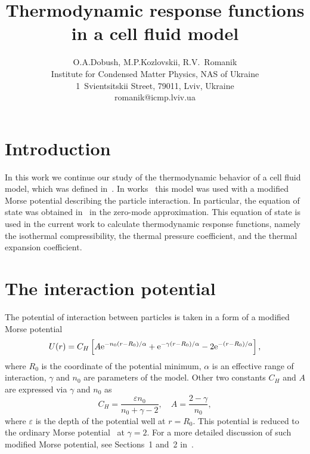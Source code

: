 \documentclass[12pt]{article}
\title{Thermodynamic response functions in a cell fluid model}
\author{O.A.Dobush, M.P.Kozlovskii, R.V.~Romanik
	\\ \small Institute for Condensed Matter Physics, NAS of Ukraine 
	\\ \small 1~Svientsitskii Street, 79011, Lviv, Ukraine 
	\\ \small romanik@icmp.lviv.ua}
\begin{document}
	
	\maketitle
	
	
	\section{Introduction}
	
	In this work we continue our study of the thermodynamic behavior of a cell fluid model, which was defined in~\cite{KozitskyKozlovskiiDobush2018book,KozitskyKozlovskiiDobush2020}. In works~\cite{KozlovskiiDobush2020,PylyukDobush2020,PylyukEtAlJML2023,PylyukKozlovskiiDobushUJP2023b} this model was used with a modified Morse potential describing the particle interaction. In particular, the equation of state was obtained in~\cite{KozlovskiiDobush2020} in the zero-mode approximation. This equation of state is used in the current work to calculate thermodynamic response functions, namely the isothermal compressibility, the thermal pressure coefficient, and the thermal expansion coefficient.
	
	\section{The interaction potential}
	The potential of interaction between particles is taken in a form of a modified Morse potential
	\begin{equation}
		\label{def:mod_morse}
		U(r) = C_{H} \left[A {\rm e}^{-n_0(r-R_0)/\alpha} + {\rm e}^{-\gamma(r - R_0)/\alpha} -2{\rm e}^{-(r-R_0)/\alpha}\right],
	\end{equation}
	where $R_0$ is the coordinate of the potential minimum, $\alpha$ is an effective range of interaction, $\gamma$ and $n_0$ are parameters of the model. Other two constants $C_{H}$ and $A$ are expressed via $\gamma$ and $n_0$ as
	\begin{equation}
		C_{H} = \frac{\varepsilon n_0}{n_0 + \gamma - 2}, \quad A = \frac{2 - \gamma}{n_0},
	\end{equation}
	where $\varepsilon$ is the depth of the potential well at $r=R_0$. This potential is reduced to the ordinary Morse potential~\cite{Morse1929} at $\gamma=2$. For a more detailed discussion of such modified Morse potential, see Sections~1 and~2 in~\cite{KozlovskiiDobush2020}.
	
\end{document}
